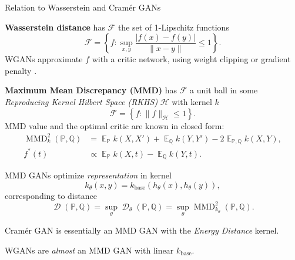 \documentclass[xcolor={table}]{beamer}
\DeclareMathOperator{\D}{\mathcal{D}}
\DeclareMathOperator*{\E}{\mathbb{E}}
\newcommand{\F}{\mathcal{F}}
\newcommand{\h}{\mathcal{H}}
\newcommand{\PP}{\mathbb P}
\newcommand{\QQ}{\mathbb Q}
\DeclareMathOperator{\mmd}{MMD}
\begin{document}
\begin{frame}{}
\begin{columns}[T, totalwidth=\textwidth]
\begin{column}{.32\textwidth}
\begin{block}{Relation to Wasserstein and Cram\'er GANs}
      \vspace*{-1.5ex}\begin{itemize}
        \item{\textbf{Wasserstein distance} has $\F$ the set of 1-Lipschitz functions
          \[  
            \F = \left\{f: \sup_{x,y} \frac{|f(x) - f(y)|}{\|x - y\|}\leq 1\right\}. 
          \]
          WGANs approximate $f$ with a critic network,
          using weight clipping \citep{wgan}
          or gradient penalty \citep{wgan-gp}.
        \item \textbf{Maximum Mean Discrepancy (MMD)} %
          has $\F$ a unit ball in some 
          \emph{Reproducing Kernel Hilbert Space (RKHS)} $\h$ with kernel $k$
          \[ \F = \left\{f: \|f\|_{\h} \leq 1\right\}. \]
          MMD value and the optimal critic are known in closed form:
          \begin{align*}
            \mmd_k^2(\PP, \QQ) &= \E_{\PP} k(X,X') + \E_{\QQ} k(Y,Y') - 2\E_{\PP,\QQ} k(X,Y),\\
            f^*(t) &\propto \E_{\PP}k(X, t) - \E_{\QQ}k(Y, t).
          \end{align*}
        }
        \item
          MMD GANs \citep{mmd-gan} optimize \emph{representation} in kernel 
          \[ k_{\theta}(x, y) = k_\mathrm{base}(h_{\theta}(x), h_{\theta}(y)), \]
          corresponding to distance
          \[ \D(\PP, \QQ) = {\sup}_\theta \D_\theta(\PP, \QQ) = {\sup}_{\theta} \mmd_{k_\theta}^2(\PP, \QQ). \]
        \item Cram\'er GAN \citep{cramer-gan} is essentially an MMD GAN with the \emph{Energy Distance} kernel.
        \item WGANs are \emph{almost} an MMD GAN with linear $k_\mathrm{base}$.
      \end{itemize}


\end{block}
\end{column}
\end{columns}
\end{frame}
\end{document}

